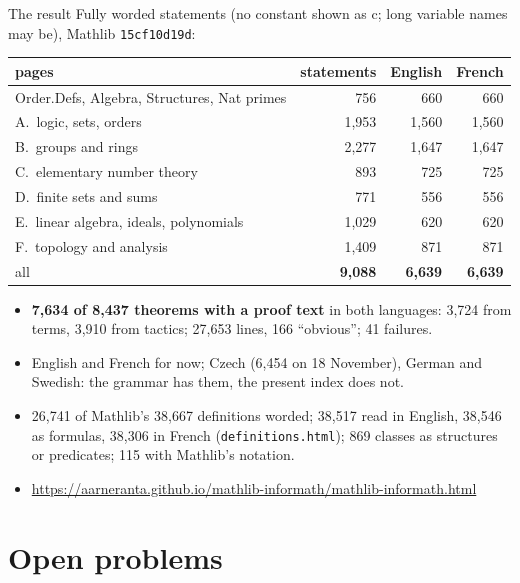 \documentclass[10pt,aspectratio=169]{beamer}
\newcommand{\commit}[1]{\texttt{\footnotesize #1}}
\begin{document}
\begin{frame}{The result}
  \centering\footnotesize
  Fully worded statements (no constant shown as $\mathrm{c}$; long variable names may be), Mathlib \commit{15cf10d19d}:

  \scriptsize\begin{tabular}{@{}lrrr@{}}
    \toprule
    pages & statements & English & French \\
    \midrule
    Order.Defs, Algebra, Structures, Nat primes & 756 & 660 & 660 \\
    A.\ logic, sets, orders & 1,953 & 1,560 & 1,560 \\
    B.\ groups and rings & 2,277 & 1,647 & 1,647 \\
    C.\ elementary number theory & 893 & 725 & 725 \\
    D.\ finite sets and sums & 771 & 556 & 556 \\
    E.\ linear algebra, ideals, polynomials & 1,029 & 620 & 620 \\
    F.\ topology and analysis & 1,409 & 871 & 871 \\
    \midrule
    all & \textbf{9,088} & \textbf{6,639} & \textbf{6,639} \\
    \bottomrule
  \end{tabular}

  \vspace{1mm}
  \raggedright\scriptsize
  \begin{itemize}
    \item \textbf{7,634 of 8,437 theorems with a proof text} in both languages: 3,724 from
          terms, 3,910 from tactics; 27,653 lines, 166 ``obvious''; 41 failures.
    \item English and French for now; Czech (6,454 on 18 November), German and Swedish: the
          grammar has them, the present index does not.
    \item 26,741 of Mathlib's 38,667 definitions worded; 38,517 read in English, 38,546 as
          formulas, 38,306 in French (\texttt{definitions.html}); 869 classes as structures or
          predicates; 115 with Mathlib's notation.
    \item \url{https://aarneranta.github.io/mathlib-informath/mathlib-informath.html}
  \end{itemize}
\end{frame}


\section{Open problems}
\end{document}

